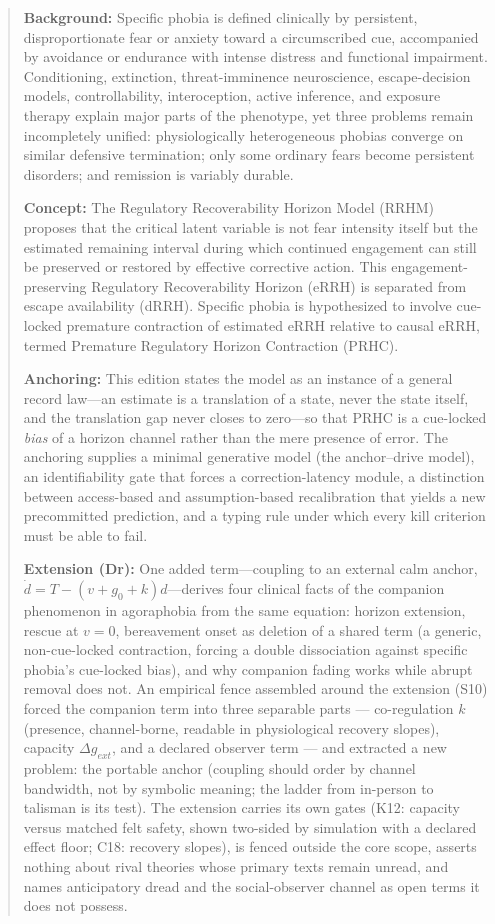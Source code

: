 \documentclass[9pt,twocolumn]{article}
\begin{document}
\begin{abstract}
\textbf{Background:} Specific phobia is defined clinically by persistent, disproportionate fear or anxiety toward a circumscribed cue, accompanied by avoidance or endurance with intense distress and functional impairment. Conditioning, extinction, threat-imminence neuroscience, escape-decision models, controllability, interoception, active inference, and exposure therapy explain major parts of the phenotype, yet three problems remain incompletely unified: physiologically heterogeneous phobias converge on similar defensive termination; only some ordinary fears become persistent disorders; and remission is variably durable.

\textbf{Concept:} The Regulatory Recoverability Horizon Model (RRHM) proposes that the critical latent variable is not fear intensity itself but the estimated remaining interval during which continued engagement can still be preserved or restored by effective corrective action. This engagement-preserving Regulatory Recoverability Horizon (eRRH) is separated from escape availability (dRRH). Specific phobia is hypothesized to involve cue-locked premature contraction of estimated eRRH relative to causal eRRH, termed Premature Regulatory Horizon Contraction (PRHC).

\textbf{Anchoring:} This edition states the model as an instance of a general record law---an estimate is a translation of a state, never the state itself, and the translation gap never closes to zero---so that PRHC is a cue-locked \emph{bias} of a horizon channel rather than the mere presence of error. The anchoring supplies a minimal generative model (the anchor--drive model), an identifiability gate that forces a correction-latency module, a distinction between access-based and assumption-based recalibration that yields a new precommitted prediction, and a typing rule under which every kill criterion must be able to fail.

\textbf{Extension (Dr):} One added term---coupling to an external calm anchor, $\dot d=T-(v+g_0+k)d$---derives four clinical facts of the companion phenomenon in agoraphobia from the same equation: horizon extension, rescue at $v=0$, bereavement onset as deletion of a shared term (a generic, non-cue-locked contraction, forcing a double dissociation against specific phobia's cue-locked bias), and why companion fading works while abrupt removal does not. An empirical fence assembled around the extension (S10) forced the companion term into three separable parts --- co-regulation $k$ (presence, channel-borne, readable in physiological recovery slopes), capacity $\Delta g_{ext}$, and a declared observer term --- and extracted a new problem: the portable anchor (coupling should order by channel bandwidth, not by symbolic meaning; the ladder from in-person to talisman is its test). The extension carries its own gates (K12: capacity versus matched felt safety, shown two-sided by simulation with a declared effect floor; C18: recovery slopes), is fenced outside the core scope, asserts nothing about rival theories whose primary texts remain unread, and names anticipatory dread and the social-observer channel as open terms it does not possess.


\end{abstract}
\end{document}
